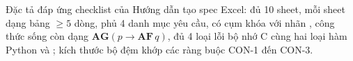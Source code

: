 Đặc tả đáp ứng checklist của Hướng dẫn tạo spec Excel: đủ 10 sheet, mỗi sheet dạng bảng
$\geq 5$ dòng, phủ 4 danh mục yêu cầu, có cụm khóa  với nhãn
, công thức sống còn dạng $\mathbf{AG}(p \rightarrow \mathbf{AF}\,q)$, đủ 4 loại
lỗi bộ nhớ C cùng hai loại hàm Python  và ; kích thước bộ đệm
khớp các ràng buộc CON-1 đến CON-3.
